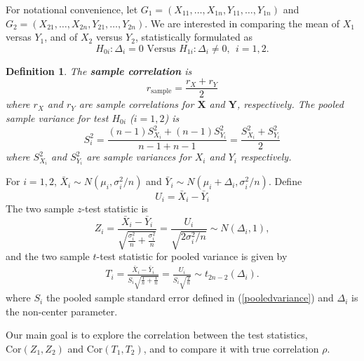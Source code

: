 \documentclass[12pt, a4paper]{article}
\newtheorem{definition}{Definition}     %
\begin{document}
	For notational convenience, let $G_1 = (X_{11}, \ldots, X_{1n}, Y_{11}, \ldots, Y_{1n})$ and $G_2 = 
	(X_{21}, \ldots, X_{2n}, Y_{21}, \ldots, Y_{2n})$. We are interested in comparing the mean of $X_1$
	versas $Y_1$, and of $X_2$ versus $Y_2$, statistically formulated as
	\begin{equation}\label{hypotheses}
		H_{0i}:  \Delta_i = 0 \text{     Versus   }  H_{1i}: \Delta_i\neq 0 ,  ~~ i = 1, 2.
	\end{equation}
	
	\begin{definition}
		The \textbf{sample correlation} is 
		\begin{equation}\label{rhosample}
			r_{\text{sample}}  = \frac{r_X + r_Y}{2}
		\end{equation}
		where $r_X$  and $r_Y$ are sample correlations for $\bm X$ and $\bm Y$, respectively.
		The pooled sample variance for test $H_{0i}$ ($i=1, 2$) is 
		\begin{equation}\label{pooledvariance}
			S_i^2 = \frac{(n-1)S_{X_i}^2 + (n-1)S_{Y_i}^2}{n-1 + n-1} = \frac{S_{X_i}^2 + S_{Y_i}^2}{2}
		\end{equation}
		where $S_{X_i}^2$ and $S_{Y_i}^2$ are sample variances for $X_i$ and $Y_i$ respectively.
	\end{definition} 
	
	
	For $i =1, 2$,  $\bar{X}_{i}\sim N(\mu_i, \sigma_i^2/n)$ and $\bar{Y}_{i}\sim N(\mu_i + \Delta_i,
	\sigma_i^2/n)$. Define
	\begin{equation}\label{expreU}
		U_i = \bar{X}_i - \bar{Y}_i
	\end{equation}
	The two sample $z$-test statistic is
	\begin{equation}\label{zTest}
		Z_i = \frac{\bar{X}_{i}-\bar{Y}_{i} }{\sqrt{\frac{\sigma^2_i}{n} + \frac{\sigma^2_i}{n}}} =
		\frac{U_i}{\sqrt{2\sigma_i^2/n}}\sim N(\Delta_i, 1) ,
	\end{equation}
	and the two sample $t$-test statistic for pooled variance is given by
	\begin{align}\label{t-test}
		T_i = \frac{\bar{X}_i - \bar{Y}_i}{S_i\sqrt{\frac{1}{n}+\frac{1}{n}}} =
		\frac{U_i}{S_i\sqrt{\frac{2}{n}}} \sim t_{2n-2}(\Delta_i). 
	\end{align}
	where $S_i$ the pooled sample standard error defined in (\ref{pooledvariance}) and $\Delta_i$ is the
	non-center parameter. 
	
	Our main goal is to explore the correlation between the test statistics, $\text{Cor}({Z_1, Z_2})$
	and $\text{Cor}({T_1, T_2})$, and to compare it with true correlation $\rho$. 
	
\end{document}
